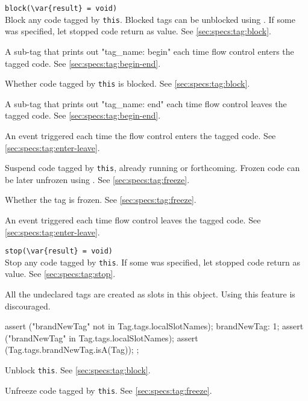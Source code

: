 \begin{urbiscriptapi}
\item \lstinline|block(\var{result} = void)|\\
  Block any code tagged by \lstinline|this|.  Blocked tags can be
  unblocked using .  If some  was
  specified, let stopped code return  as value.  See
  \autoref{sec:specs:tag:block}.

\item[begin]
  A sub-tag that prints out "tag\_name: begin" each time flow control
  enters the tagged code. See \autoref{sec:specs:tag:begin-end}.

\item[blocked]
  Whether code tagged by \lstinline|this| is blocked.  See
  \autoref{sec:specs:tag:block}.

\item[end]
  A sub-tag that prints out "tag\_name: end" each time flow control
  leaves the tagged code. See \autoref{sec:specs:tag:begin-end}.

\item[enter] An event triggered each time the flow control enters the
  tagged code.  See \autoref{sec:specs:tag:enter-leave}.

\item[freeze]
  Suspend code tagged by \lstinline|this|, already running or
  forthcoming.  Frozen code can be later unfrozen using
  .  See \autoref{sec:specs:tag:freeze}.

\item[frozen]
  Whether the tag is frozen. See  \autoref{sec:specs:tag:freeze}.

\item[leave] An event triggered each time flow control leaves the
  tagged code.  See \autoref{sec:specs:tag:enter-leave}.

\item \lstinline|stop(\var{result} = void)|\\
  Stop any code tagged by \lstinline|this|.  If some  was
  specified, let stopped code return  as value.
  See \autoref{sec:specs:tag:stop}.

\item[tags] All the undeclared tags are created as slots in this
  object.  Using this feature is discouraged.
\begin{urbiscript}
{
  assert ("brandNewTag" not in Tag.tags.localSlotNames);
  brandNewTag: 1;
  assert ("brandNewTag" in Tag.tags.localSlotNames);
  assert (Tag.tags.brandNewTag.isA(Tag));
};
\end{urbiscript}

\item[unblock]
  Unblock \lstinline|this|.  See \autoref{sec:specs:tag:block}.

\item[unfreeze]
  Unfreeze code tagged by \lstinline|this|.  See
  \autoref{sec:specs:tag:freeze}.
\end{urbiscriptapi}

